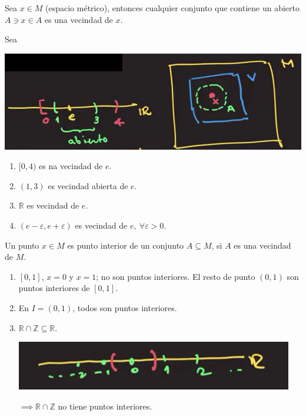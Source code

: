 \begin{definicion}
	Sea $x\in M$ (espacio métrico), entonces cualquier conjunto que contiene un abierto $A\ni x\in A$ es una vecindad de $x$. 
\end{definicion}

\begin{ejemplo}
	Sea
	\begin{center}
		\includegraphics[scale=0.4]{images/2/8}
	\end{center}
\begin{enumerate}
	\item $[0,4)$ es na vecindad de $e$. 
	\item $(1,3)$ es vecindad abierta de $e$. 
	\item $\mathbb{R}$ es vecindad de $e$. 
	\item $(e-\varepsilon, e+\varepsilon)$ es vecindad de $e, \ \forall \varepsilon >0$. 
\end{enumerate}
\end{ejemplo}

\begin{definicion}
	Un punto $x\in M$ es punto interior de un conjunto $A\subseteq M$, si $A$ es una vecindad de $M$. 
	\begin{enumerate}
		\item $[0,1]$, $x=0$ y $x=1$; no son puntos interiores. El resto de punto $(0,1)$ son puntos interiores de $[0,1]$. 
		\item En $I=(0,1)$, todos son puntos interiores. 
		\item $\mathbb{R}\cap \mathbb{Z}\subseteq \mathbb{R}$. 
		\begin{center}
			\includegraphics[scale=0.4]{images/2/9}
		\end{center}
	$\implies \mathbb{R}\cap \mathbb{Z}$ no tiene puntos interiores.  
	\end{enumerate}
\end{definicion}

